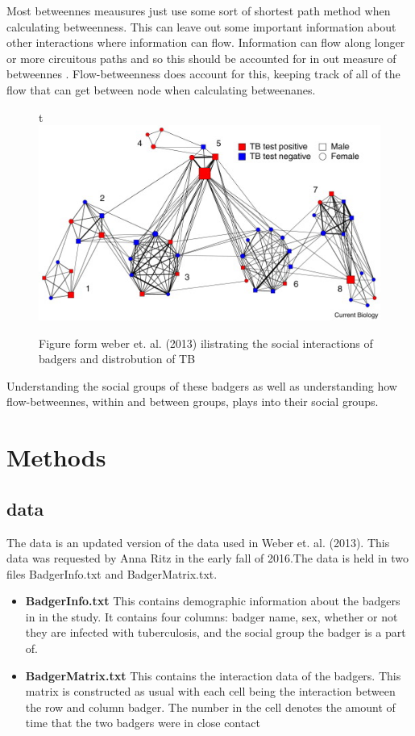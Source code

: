 \documentclass{sig-alternate-05-2015}
\begin{document}
\indent Most betweennes meausures just use some sort of shortest path method when calculating betweenness.  This can leave out some important information about other interactions where information can flow.  Information can flow along longer or more circuitous paths and so this should be accounted for in out measure of betweennes \cite{freeman-1991}.  Flow-betweenness does account for this, keeping track of all of the flow that can get between node when calculating betweenanes.
\begin{figure}{t}
\includegraphics[width=\linewidth]{weberImage.jpg}
\caption{Figure form weber et. al. (2013) ilistrating the social interactions of badgers and distrobution of TB} %
\label{badger} %
\end{figure}

\indent  Understanding the social groups of these badgers as well as understanding how flow-betweennes, within and between groups, plays into their social groups.


\section{Methods}

\subsection{data}

The data is an updated version of the data used in Weber et. al. (2013). This data was requested by Anna Ritz in the early fall of 2016.The data is held in two files BadgerInfo.txt and BadgerMatrix.txt.
\begin{itemize}
\item \textbf{BadgerInfo.txt} This contains demographic information about the badgers in in the study. It contains four columns: badger name, sex, whether or not they are infected with tuberculosis, and the social group the badger is a part of.

\item \textbf{BadgerMatrix.txt} This contains the interaction data of the badgers. This matrix is constructed as usual with each cell being the interaction between the row and column badger. The number in the cell denotes the amount of time that the two badgers were in close contact
\end{itemize}
\end{document}
